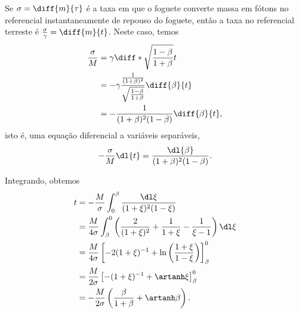 Se \(\sigma = \diff{m}{\tau}\) é a taxa em que o foguete converte massa em fótons no referencial instantaneamente de repouso do foguete, então a taxa no referencial terreste é \(\frac\sigma\gamma = \diff{m}{t}\). Neste caso, temos
\begin{align*}
    \frac{\sigma}{M} &= \gamma  \diff*{\sqrt{\frac{1 - \beta}{1+\beta}}}{t}\\
                     &= -\gamma  \frac{\frac{1}{(1+\beta)^2}}{\sqrt{\frac{1-\beta}{1+\beta}}}\diff{\beta}{t}\\
                     &= -\frac{1}{(1+\beta)^2(1-\beta)} \diff{\beta}{t},
\end{align*}
isto é, uma equação diferencial a variáveis separáveis,
\begin{equation*}
    -\frac{\sigma}{M} \dl{t} = \frac{\dl{\beta}}{(1+\beta)^2(1-\beta)}.
\end{equation*}

Integrando, obtemos
\begin{align*}
    t &= -\frac{M}{\sigma} \int_0^\beta \frac{\dl\xi}{(1+\xi)^2(1-\xi)}\\
      &= \frac{M}{4\sigma} \int_\beta^0 \left(\frac{2}{(1+\xi)^2} + \frac{1}{1+\xi} - \frac{1}{\xi - 1}\right)\dl\xi\\
      &= \frac{M}{4 \sigma} \left[-2(1+\xi)^{-1} + \ln{\left(\frac{1+\xi}{1-\xi}\right)}\right]_\beta^0\\
      &= \frac{M}{2 \sigma} \left[-(1+\xi)^{-1} + \artanh\xi\right]_\beta^0\\
      &= -\frac{M}{2 \sigma} \left(\frac{\beta}{1+\beta} + \artanh\beta\right).
\end{align*}

